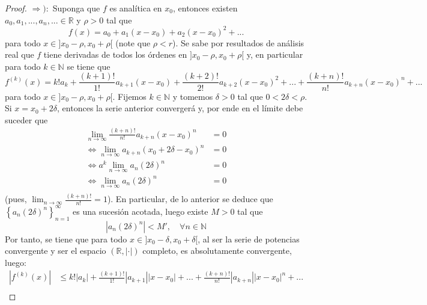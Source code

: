 \documentclass[12pt]{report}
\newcounter{it}
\theoremstyle{largebreak}
\newcommand\abs[1]{\ensuremath{\left|#1\right|}}
\begin{document}
    \begin{proof}
        $\Rightarrow):$ Suponga que $f$ es analítica en $x_0$, entonces existen $a_0,a_1,...,a_n,...\in\mathbb{R}$ y $\rho>0$ tal que
        \begin{equation*}
            f(x)=a_0+a_1(x-x_0)+a_2(x-x_0)^2+...
        \end{equation*}
        para todo $x\in]x_0-\rho,x_0+\rho[$ (note que $\rho<r$). Se sabe por resultados de análisis real que $f$ tiene derivadas de todos los órdenes en $]x_0-\rho,x_0+\rho[$ y, en particular para todo $k\in\mathbb{N}$ se tiene que
        \begin{equation*}
            f^{(k)}(x)=k!a_k+\frac{(k+1)!}{1!}a_{ k+1}(x-x_0)+\frac{(k+2)!}{2!}a_{ k+2}(x-x_0)^2+...+\frac{(k+n)!}{n!}a_{ k+n}(x-x_0)^n+...
        \end{equation*}
        para todo $x\in]x_0-\rho,x_0+\rho[$. Fijemos $k\in\mathbb{N}$ y tomemos $\delta>0$ tal que $0<2\delta<\rho$. Si $x=x_0+2\delta$, entonces la serie anterior convergerá y, por ende en el límite debe suceder que
        \begin{equation*}
            \begin{split}
                \lim_{ n\rightarrow\infty}\frac{(k+n)!}{n!}a_{ k+n}(x-x_0)^n&=0\\
                \iff \lim_{ n\rightarrow\infty}a_{ k+n}(x_0+2\delta-x_0)^n&=0\\
                \iff a^k\lim_{ n\rightarrow\infty}a_{n}(2\delta)^n&=0\\
                \iff \lim_{ n\rightarrow\infty}a_{n}(2\delta)^n&=0\\
            \end{split}
        \end{equation*}
        (pues, $\lim_{ n\rightarrow\infty}\frac{(k+n)!}{n!}=1$). En particular, de lo anterior se deduce que $\left\{a_n(2\delta)^n \right\}_{ n=1}^{\infty}$ es una sucesión acotada, luego existe $M>0$ tal que
        \begin{equation*}
            \abs{a_n(2\delta)^n}<M',\quad\forall n\in\mathbb{N}
        \end{equation*}
        Por tanto, se tiene que para todo $x\in]x_0-\delta,x_0+\delta[$, al ser la serie de potencias convergente y ser el espacio $(\mathbb{R},\abs{\cdot})$ completo, es absolutamente convergente, luego:
        \begin{equation*}
            \begin{split}
                \abs{f^{(k)}(x)}&\leq k!\abs{a_k}+\frac{(k+1)!}{1!}\abs{a_{ k+1}}\abs{x-x_0}+...+\frac{(k+n)!}{n!}\abs{a_{ k+n}}\abs{x-x_0}^n+...\\

\end{split}
\end{equation*}
\end{proof}
\end{document}
